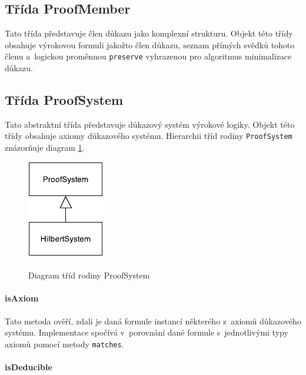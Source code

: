 \documentclass[thesis=B,czech,hidelinks]{thesis}[2012/06/26]
\begin{document}
\subsection{Třída ProofMember}

Tato třída představuje člen důkazu jako komplexní strukturu. Objekt této třídy obsahuje výrokovou formuli jakožto člen důkazu, seznam přímých svědků tohoto členu a~logickou proměnnou \texttt{preserve} vyhrazenou pro algoritmus minimalizace důkazu.

\subsection{Třída ProofSystem}

Tato abstraktní třída představuje důkazový systém výrokové logiky. Objekt této třídy obsahuje axiomy důkazového systému. Hierarchii tříd rodiny \texttt{ProofSystem} znázorňuje diagram \ref{fig:proof_system}.

\begin{figure}
\centering
\caption{Diagram tříd rodiny ProofSystem}
\includegraphics{diagrams/proof_system}
\label{fig:proof_system}
\end{figure}

\paragraph{isAxiom}

Tato metoda ověří, zdali je daná formule instancí některého z~axiomů důkazového systému. Implementace spočívá v~porovnání dané formule s~jednotlivými typy axiomů pomocí metody \texttt{matches}.

\begin{algorithm}
{
	{
		\;
	}
}
\;
\end{algorithm}

\paragraph{isDeducible}
\end{document}
